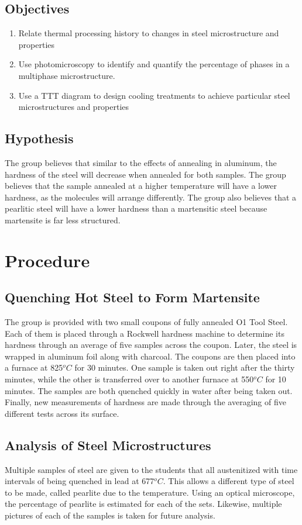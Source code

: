 \documentclass{article}
\begin{document}
\subsection{Objectives}
\begin{enumerate}
\item Relate thermal processing history to changes in steel microstructure and properties
\item Use photomicroscopy to identify and quantify the percentage of phases in a multiphase microstructure.
\item Use a TTT diagram to design cooling treatments to achieve particular steel microstructures and properties
\end{enumerate}

\subsection{Hypothesis}
The group believes that similar to the effects of annealing in aluminum, the hardness of the steel will decrease when annealed for both samples. The group believes that the sample annealed at a higher temperature will have a lower hardness, as the molecules will arrange differently. The group also believes that a pearlitic steel will have a lower hardness than a martensitic steel because martensite is far less structured.



\section{Procedure}
\subsection{Quenching Hot Steel to Form Martensite}
The group is provided with two small coupons of fully annealed O1 Tool Steel. Each of them is placed through a Rockwell hardness machine to determine its hardness through an average of five samples across the coupon. Later, the steel is wrapped in aluminum foil along with charcoal. The coupons are then placed into a furnace at 825$^oC$ for 30 minutes. One sample is taken out right after the thirty minutes, while the other is transferred over to another furnace at 550$^oC$ for 10 minutes. The samples are both quenched quickly in water after being taken out. Finally, new measurements of hardness are made through the averaging of five different tests across its surface. 

\subsection{Analysis of Steel Microstructures}
Multiple samples of steel are given to the students that all austenitized with time intervals of being quenched in lead at 677$^oC$. This allows a different type of steel to be made, called pearlite due to the temperature.  Using an optical microscope, the percentage of pearlite is estimated for each of the sets. Likewise, multiple pictures of each of the samples is taken for future analysis. 
\end{document}

